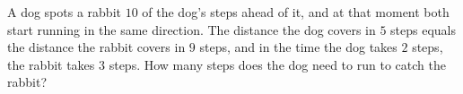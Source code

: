 A dog spots a rabbit $10$ of the dog's steps ahead of it, and at that moment both start running in the same direction. The distance the dog covers in $5$ steps equals the distance the rabbit covers in $9$ steps, and in the time the dog takes $2$ steps, the rabbit takes $3$ steps. How many steps does the dog need to run to catch the rabbit?
